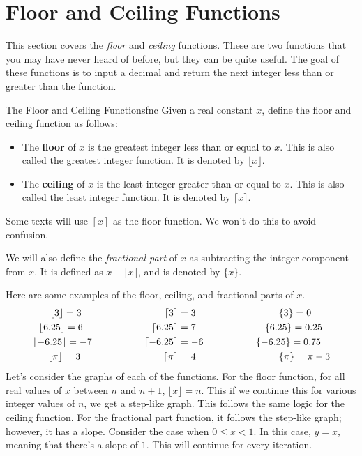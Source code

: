 \documentclass[lang=en,11pt]{elegantbook}
\begin{document}
\section{Floor and Ceiling Functions}
\noindent This section covers the \textit{floor} and \textit{ceiling} functions.  These are two functions that you may have never heard of before, but they can be quite useful.  The goal of these functions is to input a decimal and return the next integer less than or greater than the function. 
\begin{definition}{The Floor and Ceiling Functions}{fnc}
Given a real constant $x$, define the floor and ceiling function as follows:\begin{itemize}
    \item The \textbf{floor} of $x$ is the greatest integer less than or equal to $x$.  This is also called the \underline{greatest integer function}.  It is denoted by $\lfloor{x}\rfloor$.
    \item The \textbf{ceiling} of $x$ is the least integer greater than or equal to $x$.  This is also called the \underline{least integer function}.  It is denoted by $\lceil{x}\rceil$.
\end{itemize}
\end{definition}
\begin{remark}
Some texts will use $[x]$ as the floor function.  We won't do this to avoid confusion.
\end{remark}
We will also define the \textit{fractional part} of $x$ as subtracting the integer component from $x$.  It is defined as $x-\lfloor{x}\rfloor$, and is denoted by $\{x\}$.

Here are some examples of the floor, ceiling, and fractional parts of $x$.\begin{align*}
    \lfloor{3}\rfloor=3 \hspace{30mm} \lceil{3}\rceil&=3 \hspace{30mm} \{3\}=0 \\
    \lfloor{6.25}\rfloor=6 \hspace{25mm} \lceil{6.25}\rceil&=7 \hspace{25mm} \{6.25\}=0.25 \\
    \lfloor{-6.25}\rfloor=-7 \hspace{19mm} \lceil{-6.25}\rceil&=-6 \hspace{19mm} \{-6.25\}=0.75 \\
    \lfloor{\pi}\rfloor=3 \hspace{30mm} \lceil{\pi}\rceil&=4 \hspace{30mm} \{\pi\}=\pi-3
\end{align*}
Let's consider the graphs of each of the functions.  For the floor function, for all real values of $x$ between $n$ and $n+1$, $\lfloor{x}\rfloor=n$.  This if we continue this for various integer values of $n$, we get a step-like graph. This follows the same logic for the ceiling function.  For the fractional part function, it follows the step-like graph; however, it has a slope.  Consider the case when $0\leq x<1$.  In this case, $y=x$, meaning that there's a slope of $1$.  This will continue for every iteration.
\end{document}
